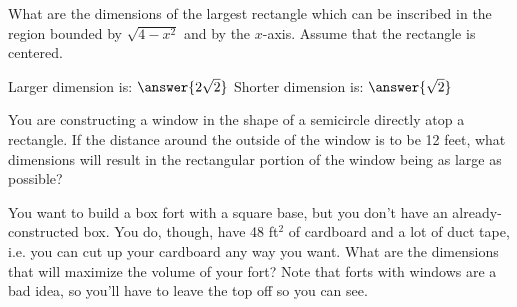 \documentclass[handout]{ximera}
\begin{document}
\begin{exercise}

\end{exercise}

\begin{exercise}

	
What are the dimensions of the largest rectangle which can be inscribed in the region bounded by $\sqrt{4-x^2}$ and by the $x$-axis. Assume that the rectangle is centered.

Larger dimension is: $\answer{2\sqrt{2}}$ Shorter dimension is: $\answer{\sqrt{2}}$

\end{exercise}

\begin{exercise}
	You are constructing a window in the shape of a semicircle directly atop a rectangle. If the distance around the outside of the window is to be 12 feet, what dimensions will result in the rectangular portion of the window being as large as possible?
    
    
    
\end{exercise}

\begin{exercise}
You want to build a box fort with a square base, but you don't have an already-constructed box. You do, though, have 48 ft$^2$ of cardboard and a lot of duct tape, i.e. you can cut up your cardboard any way you want. What are the dimensions that will maximize the volume of your fort? Note that forts with windows are a bad idea, so you'll have to leave the top off so you can see.



\end{exercise}
\end{document}
